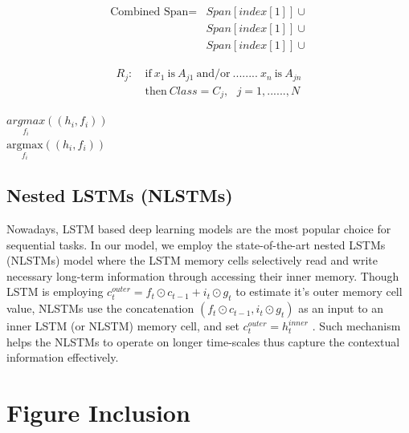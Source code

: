 \documentclass[11pt]{article}
\begin{document}
\begin{equation*}
\begin{split}
\mbox{Combined Span} = &Span[index[1]] \cup \\ %
                       &Span[index[1]] \cup \\
                       &Span[index[1]] \cup
\end{split}
\end{equation*}

\begin{equation*}
\begin{split}
R_j: & \ \mbox{if}\ x_1\ \mbox{is}\ A_{j1}\ \mbox{and/or}\ ........\ x_n\ \mbox{is}\ A_{jn} \\
     & \ \mbox{then}\ Class = C_j, \ \ \ j=1, ......,N     
\end{split}
\end{equation*}

$\underset{f_i}{argmax} ((h_i, f_i))$ \\
$\underset{f_i}{\mbox{argmax}} ((h_i, f_i))$

\subsection{Nested LSTMs (NLSTMs)}
\label{ref:nestedLSTMs}
Nowadays, LSTM based deep learning models are the most popular choice for sequential tasks. In our model, we employ the state-of-the-art nested LSTMs (NLSTMs) model where the LSTM memory cells selectively read and write necessary long-term information through accessing their inner memory. Though LSTM is employing $c_t^{outer}={f_{t}}\odot{c_{t-1}+i_t}\odot{g_{t}}$ to estimate it’s outer memory cell value, NLSTMs use the concatenation $(f_t\odot{c_{t-1}},i_t\odot{g_t}) $ as an input to an inner LSTM (or NLSTM) memory cell, and set $c_t^{outer}=h_t^{inner} $ . Such mechanism helps the NLSTMs to operate on longer time-scales thus capture the
contextual information effectively.

\section{Figure Inclusion}
\label{ref:figure}
\end{document}
